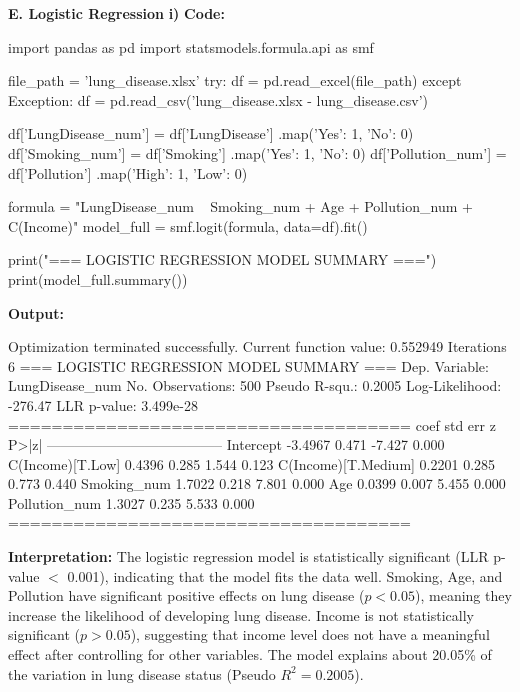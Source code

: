 \documentclass[12pt,a4paper]{article}
\begin{document}
\textbf{E. Logistic Regression}
\textbf{i)}
\textbf{Code:}
\begin{codebox}
import pandas as pd
import statsmodels.formula.api as smf

file_path = 'lung_disease.xlsx'
try:
    df = pd.read_excel(file_path)
except Exception:
    df = pd.read_csv('lung_disease.xlsx - lung_disease.csv')

df['LungDisease_num'] = df['LungDisease']
.map({'Yes': 1, 'No': 0})
df['Smoking_num'] = df['Smoking']
.map({'Yes': 1, 'No': 0})
df['Pollution_num'] = df['Pollution']
.map({'High': 1, 'Low': 0})

formula = "LungDisease_num ~ Smoking_num +
Age + Pollution_num + C(Income)"
model_full = smf.logit(formula, data=df).fit()

print("=== LOGISTIC REGRESSION MODEL SUMMARY ===")
print(model_full.summary())
\end{codebox}

\textbf{Output:}
\begin{codebox}
Optimization terminated successfully.
Current function value: 0.552949
Iterations 6
=== LOGISTIC REGRESSION MODEL SUMMARY ===
Dep. Variable: LungDisease_num
No. Observations: 500
Pseudo R-squ.: 0.2005
Log-Likelihood: -276.47
LLR p-value: 3.499e-28
=====================================
coef std err z P>|z|
--------------------------------------
Intercept -3.4967 0.471 -7.427 0.000
C(Income)[T.Low] 0.4396 0.285 1.544 0.123
C(Income)[T.Medium] 0.2201 0.285 0.773 0.440
Smoking_num 1.7022 0.218 7.801 0.000
Age 0.0399 0.007 5.455 0.000
Pollution_num 1.3027 0.235 5.533 0.000
=====================================
\end{codebox}

\textbf{Interpretation:}
The logistic regression model is statistically significant (LLR p-value $<$ 0.001), indicating that the model fits the data well.
Smoking, Age, and Pollution have significant positive effects on lung disease ($p < 0.05$), meaning they increase the likelihood of developing lung disease.
Income is not statistically significant ($p > 0.05$), suggesting that income level does not have a meaningful effect after controlling for other variables.
The model explains about 20.05\% of the variation in lung disease status (Pseudo $R^2 = 0.2005$).
\end{document}
